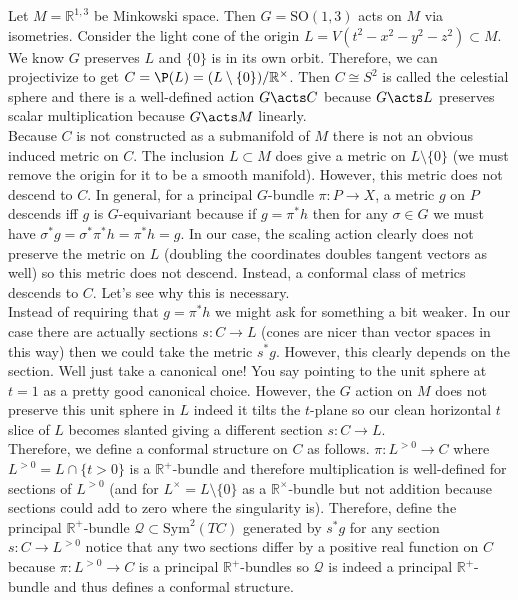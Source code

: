\documentclass[12pt]{article}
\begin{document}
Let $M = \mathbb{R}^{1,3}$ be Minkowski space. Then $G = \mathrm{SO}(1,3)$ acts on $M$ via isometries. Consider the light cone of the origin $L = V(t^2 - x^2 - y^2 - z^2) \subset M$. We know $G$ preserves $L$ and $\{ 0 \}$ is in its own orbit. Therefore, we can projectivize to get $C = \P(L) = (L \setminus \{ 0 \} ) / \mathbb{R}^\times$. Then $C \cong S^2$ is called the celestial sphere and there is a well-defined action $G \acts C$ because $G \acts L$ preserves scalar multiplication because $G \acts M$ linearly. 
\bigskip\\
Because $C$ is not constructed as a submanifold of $M$ there is not an obvious induced metric on $C$. The inclusion $L \subset M$ does give a metric on $L \setminus \{ 0 \}$ (we must remove the origin for it to be a smooth manifold). However, this metric does not descend to $C$. In general, for a principal $G$-bundle $\pi : P \to X$, a metric $g$ on $P$ descends iff $g$ is $G$-equivariant because if $g = \pi^* h$ then for any $\sigma \in G$ we must have $\sigma^* g = \sigma ^* \pi^* h = \pi^* h = g$. In our case, the scaling action clearly does not preserve the metric on $L$ (doubling the coordinates doubles tangent vectors as well) so this metric does not descend. Instead, a conformal class of metrics descends to $C$. Let's see why this is necessary. 
\bigskip\\
Instead of requiring that $g = \pi^* h$ we might ask for something a bit weaker. In our case there are actually sections $s : C \to L$ (cones are nicer than vector spaces in this way) then we could take the metric $s^* g$. However, this clearly depends on the section. Well just take a canonical one! You say pointing to the unit sphere at $t = 1$ as a pretty good canonical choice. However, the $G$ action on $M$ does not preserve this unit sphere in $L$ indeed it tilts the $t$-plane so our clean horizontal $t$ slice of $L$ becomes slanted giving a different section $s : C \to L$. 
\bigskip\\
Therefore, we define a conformal structure on $C$ as follows. $\pi : L^{> 0} \to C$ where $L^{>0} = L \cap \{ t > 0 \}$ is a $\mathbb{R}^+$-bundle and therefore multiplication is well-defined for sections of $L^{> 0}$ (and for $L^\times = L \setminus \{ 0 \}$ as a $\mathbb{R}^\times$-bundle but not addition because sections could add to zero where the singularity is). Therefore, define the principal $\mathbb{R}^+$-bundle $\mathcal{Q} \subset \mathrm{Sym}^2(TC)$ generated by $s^* g$ for any section $s : C \to L^{>0}$ notice that any two sections differ by a positive real function on $C$ because $\pi : L^{>0} \to C$ is a principal $\mathbb{R}^{+}$-bundles so $\mathcal{Q}$ is indeed a principal $\mathbb{R}^+$-bundle and thus defines a conformal structure. 
\end{document}
